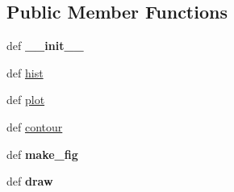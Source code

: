 \subsection*{Public Member Functions}
\begin{DoxyCompactItemize}
\item 
\hypertarget{classaml__planners_1_1push__planner_1_1push__worlds_1_1plotter_1_1_plotter_a91cc255d18a68c8ae8b657f5b1d52559}{def {\bfseries \-\_\-\-\_\-init\-\_\-\-\_\-}}\label{classaml__planners_1_1push__planner_1_1push__worlds_1_1plotter_1_1_plotter_a91cc255d18a68c8ae8b657f5b1d52559}

\item 
def \hyperlink{classaml__planners_1_1push__planner_1_1push__worlds_1_1plotter_1_1_plotter_a080a8bedde0055a10e7f3f9e86a9bab5}{hist}
\item 
def \hyperlink{classaml__planners_1_1push__planner_1_1push__worlds_1_1plotter_1_1_plotter_a4f13f12e493b7c8746dff5b4a433d930}{plot}
\item 
def \hyperlink{classaml__planners_1_1push__planner_1_1push__worlds_1_1plotter_1_1_plotter_acec61714129e276f05e6dd2947eb3d07}{contour}
\item 
\hypertarget{classaml__planners_1_1push__planner_1_1push__worlds_1_1plotter_1_1_plotter_a44a6913eb5a3326dde005a9003ee4afb}{def {\bfseries make\-\_\-fig}}\label{classaml__planners_1_1push__planner_1_1push__worlds_1_1plotter_1_1_plotter_a44a6913eb5a3326dde005a9003ee4afb}

\item 
\hypertarget{classaml__planners_1_1push__planner_1_1push__worlds_1_1plotter_1_1_plotter_a44c6097b9834530eccf5720e10fb75b4}{def {\bfseries draw}}\label{classaml__planners_1_1push__planner_1_1push__worlds_1_1plotter_1_1_plotter_a44c6097b9834530eccf5720e10fb75b4}

\end{DoxyCompactItemize}


